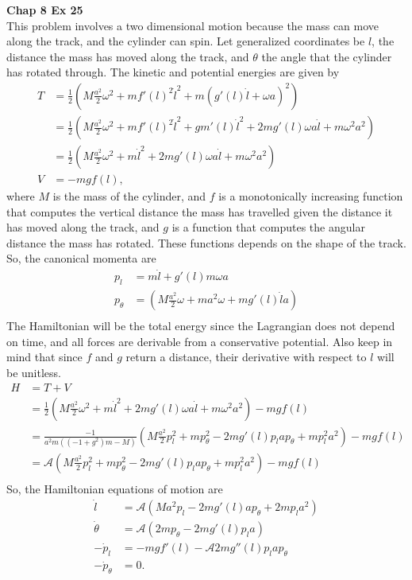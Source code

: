 \documentclass[10pt]{article}
\begin{document}
\textbf{Chap 8 Ex 25}\\
This problem involves a two dimensional motion because the mass can move along the track, and
the cylinder can spin.  Let generalized coordinates be $l$, the distance the mass has moved along
the track, and $\theta$ the angle that the cylinder has rotated through.  The kinetic and potential
energies are given by
\begin{align*}
  T &= \frac{1}{2} \left( M\frac{a^2}{2}\omega^2+mf'(l)^2\dot l^2+m(g'(l)\dot l+\omega a)^2 \right)\\
    &= \frac{1}{2} \left( M\frac{a^2}{2}\omega^2+mf'(l)^2\dot l^2+gm'(l)\dot l^2 + 2mg'(l)\omega a\dot l + m\omega^2 a^2 \right)\\
    &= \frac{1}{2} \left( M\frac{a^2}{2}\omega^2+m\dot l^2 + 2mg'(l)\omega a\dot l + m\omega^2 a^2 \right)\\
  V &= -mgf(l),
\end{align*}
where $M$ is the mass of the cylinder, and $f$ is a monotonically increasing function that computes the vertical
distance the mass has travelled given the distance it has moved along the track, and $g$ is a function that 
computes the angular distance the mass has rotated.  These functions depends on the shape of the track.  So, 
the canonical momenta are
\begin{align*}
  p_l &= m\dot l + g'(l)m\omega a\\
  p_{\theta} &= \left( M\frac{a^2}{2}\omega+ma^2\omega+mg'(l)\dot la \right)\\
\end{align*}
The Hamiltonian will be the total energy since the Lagrangian does not depend on time, and all forces are derivable
from a conservative potential.  Also keep in mind that since $f$ and $g$ return a distance, their derivative with
respect to $l$ will be unitless.
\begin{align*}
  H &= T+V\\
    &= \frac{1}{2} \left( M\frac{a^2}{2}\omega^2+m\dot l^2 + 2mg'(l)\omega a\dot l + m\omega^2 a^2 \right)-mgf(l)\\
    &= \frac{-1}{a^2 m ((-1 + g^2) m - M) } \left( M\frac{a^2}{2}p_l^2+mp_{\theta}^2 - 2mg'(l)p_l ap_{\theta} +m p_l^2 a^2 \right)-mgf(l)\\
    &= \mathcal{A} \left( M\frac{a^2}{2}p_l^2+mp_{\theta}^2 - 2mg'(l)p_l ap_{\theta} +m p_l^2 a^2 \right)-mgf(l)\\
\end{align*}
So, the Hamiltonian equations of motion are
\begin{align*}
  \dot l &= \mathcal{A} \left( Ma^2p_l - 2mg'(l) ap_{\theta} +2m p_l a^2 \right)\\
  \dot \theta &= \mathcal{A} \left( 2mp_{\theta} - 2mg'(l)p_l a \right)\\
  -\dot p_l &= -mgf'(l) - \mathcal{A}2mg''(l)p_l ap_{\theta}\\
  -\dot p_{\theta} &= 0.
\end{align*}
\end{document}
